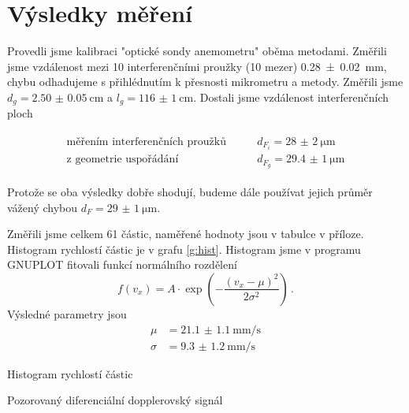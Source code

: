 \section*{Výsledky měření}

Provedli jsme kalibraci "optické sondy anemometru" oběma metodami.
Změřili jsme vzdálenost mezi 10 interferenčními proužky (10 mezer) \SI{0.28(2)}{\mm}, chybu odhadujeme s přihlédnutím k přesnosti mikrometru a metody. Změřili jsme $d_g = \SI{2.50(5)}{\cm}$ a $l_g = \SI{116(1)}{\cm}$. Dostali jsme vzdálenost interferenčních ploch


\begin{align*}
\begin{split}
\text{měřením interferenčních proužků} & \qquad d_{F_i} = \SI{28(2)}{\micro\m} \\
\text{z geometrie uspořádání} & \qquad d_{F_g} = \SI{29.4(10)}{\micro\m}
\end{split}
\end{align*}

Protože se oba výsledky dobře shodují, budeme dále používat jejich průměr vážený chybou $d_F = \SI{29(1)}{\micro\m}$.

Změřili jsme celkem 61 částic, naměřené hodnoty jsou v tabulce v příloze. Histogram rychlostí částic je v grafu \ref{g:hist}.
Histogram jsme v programu GNUPLOT fitovali funkcí normálního rozdělení
\begin{equation*}
f(v_x)=A \cdot \exp{\left(-\frac{(v_x-\mu)^2}{2\sigma^2}\right)} \,.
\end{equation*}
Výsledné parametry jsou
\begin{align*}
\mu &= \SI{21.1(11)}{\mm\per\s}\\
\sigma &= \SI{9.3(12)}{\mm\per\s}
\end{align*}

\begin{graph}[htbp] 
\centering

\caption{Histogram rychlostí částic}
\label{g:hist}
\end{graph}

\begin{graph}[htbp] 
\centering

\caption{Pozorovaný diferenciální dopplerovský signál}
\label{g:typ}
\end{graph}